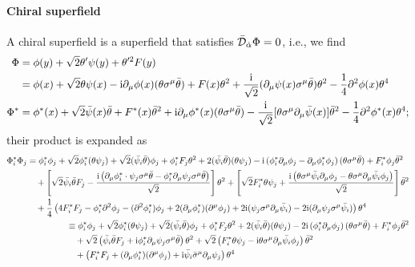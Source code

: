 \documentclass[CheatSheet]{subfiles}
\newcommand{\OD}{{\mathcal D}}
\begin{document}
\paragraph{Chiral superfield} A chiral superfield is a superfield that satisfies $\bar \OD_\dalpha \Phi = 0$, i.e.,
we find
\begin{align}
 \Phi
 &= \phi(y) + \sqrt{2} \theta' \psi(y) + \theta'^2 F(y)\\
 &= \phi(x)+\sqrt{2} \theta \psi(x)-\mathrm{i} \partial_{\mu}\phi(x) (\theta \sigma^{\mu}\bar\theta)+F(x) \theta^2+\frac{\mathrm{i}}{\sqrt{2}} (\partial_{\mu}\psi(x)\sigma^{\mu}\bar\theta) \theta^2-\frac{1}{4} \partial^2\phi(x) \theta^4
\\
 \Phi^*
 &= \phi^*(x)+\sqrt{2} \bar{\psi}(x)\bar\theta+F^*(x) \bar\theta^2+\mathrm{i} \partial_{\mu}\phi^*(x) (\theta \sigma^{\mu}\bar\theta)-\frac{\mathrm{i}}{\sqrt{2}}[\theta \sigma^{\mu}\partial_{\mu}\bar{\psi}(x)] \bar\theta^2-\frac{1}{4} \partial^2\phi^*(x) \theta^4;
\end{align}
their product is expanded as
\begin{align}
\begin{split}
 \Phi_i^* \Phi_j
 &=
 \phi_i^*\phi_j + \sqrt{2} \phi_i^*(\theta \psi_j)+\sqrt{2} (\bar{\psi_i}\bar\theta)\phi_j
 + \phi_i^* F_j \theta^2+2 (\bar{\psi_i}\bar\theta)(\theta \psi_j)
 -\mathrm{i} \left(\phi_i^*\partial_{\mu}\phi_j-\partial_{\mu}\phi_i^*\phi_j\right) (\theta \sigma^{\mu}\bar\theta)
 +F_i^*\phi_j \bar\theta^2
 \\&\quad
+\left[
\sqrt{2} \bar{\psi_i}\bar\theta F_j-\frac{\mathrm{i}\left( \partial_{\mu}\phi_i^*\cdot\psi_j\sigma^{\mu}\bar\theta-\phi_i^*\partial_{\mu}\psi_j\sigma^{\mu}\bar\theta\right)}{\sqrt2}\right]\theta^2
+\left[\sqrt2 F_i^*\theta \psi_j+\frac{\mathrm{i}\left(\theta \sigma^{\mu}\bar{\psi_i}\partial_{\mu}\phi_j-\theta \sigma^{\mu}\partial_{\mu}\bar{\psi_i}\phi_j\right)}{\sqrt2}\right] \bar\theta^2
\\&\quad
+\frac{1}{4} \left(4 F_i^*F_j-\phi_i^*\partial^2\phi_j-(\partial^2\phi_i^*)\phi_j+2 (\partial_{\mu}\phi_i^*)(\partial^{\mu}\phi_j)+2 \mathrm{i} (\psi_j\sigma^{\mu}\partial_{\mu}\bar{\psi_i})-2 \mathrm{i} (\partial_{\mu}\psi_j\sigma^{\mu}\bar{\psi_i})\right) \theta^4
\end{split}
\\
\begin{split}
 &\equiv
 \phi_i^*\phi_j + \sqrt{2} \phi_i^*(\theta \psi_j)+\sqrt{2} (\bar{\psi_i}\bar\theta)\phi_j
 + \phi_i^* F_j \theta^2+2 (\bar{\psi_i}\bar\theta)(\theta \psi_j)
 -2\mathrm{i} \left(\phi_i^*\partial_{\mu}\phi_j\right) (\theta \sigma^{\mu}\bar\theta)
 +F_i^*\phi_j \bar\theta^2
 \\&\quad
+\sqrt2\left(
\bar{\psi_i}\bar\theta F_j+\mathrm{i}\phi_i^*\partial_{\mu}\psi_j\sigma^{\mu}\bar\theta\right)\theta^2
+\sqrt2\left(F_i^*\theta \psi_j-\mathrm{i}\theta \sigma^{\mu}\partial_{\mu}\bar{\psi_i}\phi_j\right) \bar\theta^2
\\&\quad
+\left(F_i^*F_j+(\partial_{\mu}\phi_i^*)(\partial^{\mu}\phi_j)+\mathrm{i}\bar{\psi_i}\bar\sigma^\mu\partial_{\mu}\psi_j\right) \theta^4
\end{split}
\end{align}
\end{document}
